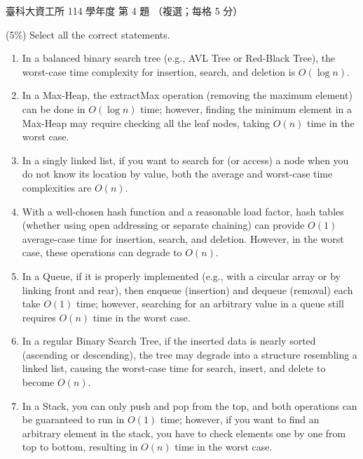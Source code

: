 \begin{pastexam}[label={px:ntust-114-ice-04}]{臺科大資工所 114 學年度 第 4 題}
（複選；每格 5 分）

(5\%) Select all the correct statements.
\begin{enumerate}[label=(\alph*)]
\item In a balanced binary search tree (e.g., AVL Tree or Red-Black Tree), the worst-case time
complexity for insertion, search, and deletion is $O(\log n)$.
\item In a Max-Heap, the extractMax operation (removing the maximum element) can be done in
$O(\log n)$ time; however, finding the minimum element in a Max-Heap may require checking all the
leaf nodes, taking $O(n)$ time in the worst case.
\item In a singly linked list, if you want to search for (or access) a node when you do not know
its location by value, both the average and worst-case time complexities are $O(n)$.
\item With a well-chosen hash function and a reasonable load factor, hash tables (whether using
open addressing or separate chaining) can provide $O(1)$ average-case time for insertion, search,
and deletion. However, in the worst case, these operations can degrade to $O(n)$.
\item In a Queue, if it is properly implemented (e.g., with a circular array or by linking front and
rear), then enqueue (insertion) and dequeue (removal) each take $O(1)$ time; however, searching for
an arbitrary value in a queue still requires $O(n)$ time in the worst case.
\item In a regular Binary Search Tree, if the inserted data is nearly sorted (ascending or
descending), the tree may degrade into a structure resembling a linked list, causing the
worst-case time for search, insert, and delete to become $O(n)$.
\item In a Stack, you can only push and pop from the top, and both operations can be guaranteed to
run in $O(1)$ time; however, if you want to find an arbitrary element in the stack, you have to
check elements one by one from top to bottom, resulting in $O(n)$ time in the worst case.
\end{enumerate}
\end{pastexam}

